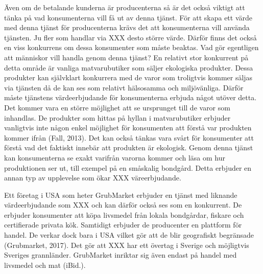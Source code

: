 \documentclass[10pt,a4paper,oneside]{article}
\begin{document}
Även om de betalande kunderna är producenterna så är det också viktigt att tänka på vad konsumenterna vill få ut av denna tjänst. För att skapa ett värde med denna tjänst för producenterna krävs det att konsumenterna vill använda tjänsten. Ju fler som handlar via XXX desto större värde. Därför finns det också en viss konkurrens om dessa konsumenter som måste beaktas. Vad gör egentligen att människor vill handla genom denna tjänst? En relativt stor konkurrent på detta område är vanliga matvarubutiker som säljer ekologiska produkter. Dessa produkter kan självklart konkurrera med de varor som troligtvis kommer säljas via tjänsten då de kan ses som relativt hälsosamma och miljövänliga. Därför måste tjänstens värdeerbjudande för konsumenterna erbjuda något utöver detta. Det kommer vara en  större möjlighet att se ursprunget till de varor som inhandlas. De produkter som hittas på hyllan i matvarubutiker erbjuder vanligtvis inte någon enkel möjlighet för konsumenten att förstå var produkten kommer ifrån (Fall, 2013). Det kan också tänkas vara svårt för konsumenter att förstå vad det faktiskt innebär att produkten är ekologisk. Genom denna tjänst kan konsumenterna se exakt varifrån varorna kommer och läsa om hur produktionen ser ut, till exempel på en småskalig bondgård. Detta erbjuder en annan typ av upplevelse som ökar XXX väreerbjudande. 

Ett företag i USA som heter GrubMarket erbjuder en tjänst med liknande värdeerbjudande som XXX och kan därför också ses som en konkurrent. De erbjuder konsumenter att köpa livsmedel från lokala bondgårdar, fiskare och certifierade privata kök. Samtidigt erbjuder de producenter en plattform för handel. De verkar dock bara i USA vilket gör att de blir geografiskt begränsade (Grubmarket, 2017). Det gör att XXX har ett övertag i Sverige och möjligtvis Sveriges grannländer. GrubMarket inriktar sig även endast på handel med livsmedel och mat (iBid.). 
\end{document}
